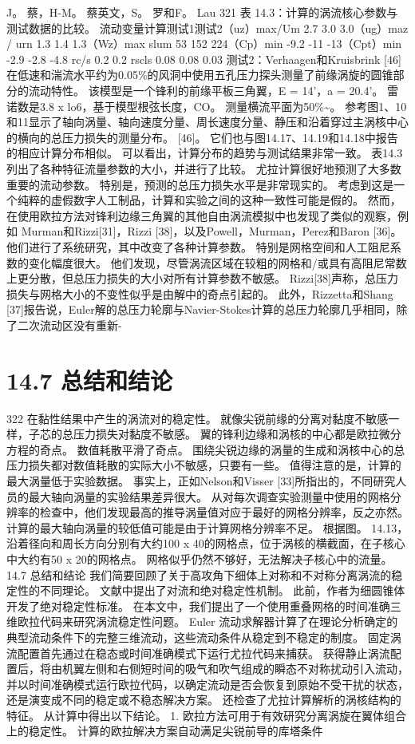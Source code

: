\documentclass[UTF8,11pt,a4paper,openany,fontset=fandol]{ctexbook}
\begin{document}
J。 蔡，H-M。 蔡英文，S。 罗和F。 Lau 321 表 14.3：计算的涡流核心参数与测试数据的比较。 流动变量计算测试1测试2（uz）max/Um 2.7 3.0 3.0（ug）maz / urn 1.3 1.4 1.3（Wz）max slum 53 152 224（Cp）min -9.2 -11 -13（Cpt）min -2.9 -2.8 -4.8 rc/s 0.2 0.2 rscls 0.08 0.08 0.03 测试2：Verhaagen和Kruisbrink [46]在低速和湍流水平约为0.05\%的风洞中使用五孔压力探头测量了前缘涡旋的圆锥部分的流动特性。 该模型是一个锋利的前缘平板三角翼，E = 14'，a = 20.4'。 雷诺数是3.8 x lo6，基于模型根弦长度，CO。 测量横流平面为50\%\textasciitilde{}。 参考图1、10和11显示了轴向涡量、轴向速度分量、周长速度分量、静压和沿着穿过主涡核中心的横向的总压力损失的测量分布。 [46]。 它们也与图14.17、14.19和14.18中报告的相应计算分布相似。 可以看出，计算分布的趋势与测试结果非常一致。 表14.3列出了各种特征流量参数的大小，并进行了比较。 尤拉计算很好地预测了大多数重要的流动参数。 特别是，预测的总压力损失水平是非常现实的。 考虑到这是一个纯粹的虚假数字人工制品，计算和实验之间的这种一致性可能是假的。 然而，在使用欧拉方法对锋利边缘三角翼的其他自由涡流模拟中也发现了类似的观察，例如 Murman和Rizzi[31]，Rizzi [38]，以及Powell，Murman，Perez和Baron [36]。 他们进行了系统研究，其中改变了各种计算参数。 特别是网格空间和人工阻尼系数的变化幅度很大。 他们发现，尽管涡流区域在较粗的网格和/或具有高阻尼常数上更分散，但总压力损失的大小对所有计算参数不敏感。 Rizzi[38]声称，总压力损失与网格大小的不变性似乎是由解中的奇点引起的。 此外，Rizzetta和Shang [37]报告说，Euler解的总压力轮廓与Navier-Stokes计算的总压力轮廓几乎相同，除了二次流动区没有重新-

\section{14.7 总结和结论}
322 在黏性结果中产生的涡流对的稳定性。 就像尖锐前缘的分离对黏度不敏感一样，子芯的总压力损失对黏度不敏感。 翼的锋利边缘和涡核的中心都是欧拉微分方程的奇点。 数值耗散平滑了奇点。 围绕尖锐边缘的涡量的生成和涡核中心的总压力损失都对数值耗散的实际大小不敏感，只要有一些。 值得注意的是，计算的最大涡量低于实验数据。 事实上，正如Nelson和Visser [33]所指出的，不同研究人员的最大轴向涡量的实验结果差异很大。 从对每次调查实验测量中使用的网格分辨率的检查中，他们发现最高的推导涡量值对应于最好的网格分辨率，反之亦然。 计算的最大轴向涡量的较低值可能是由于计算网格分辨率不足。 根据图。 14.13，沿着径向和周长方向分别有大约100 x 40的网格点，位于涡核的横截面，在子核心中大约有50 x 20的网格点。 网格似乎仍然不够好，无法解决子核心中的流量。 14.7 总结和结论 我们简要回顾了关于高攻角下细体上对称和不对称分离涡流的稳定性的不同理论。 文献中提出了对流和绝对稳定性机制。 此前，作者为细圆锥体开发了绝对稳定性标准。 在本文中，我们提出了一个使用重叠网格的时间准确三维欧拉代码来研究涡流稳定性问题。 Euler 流动求解器计算了在理论分析确定的典型流动条件下的完整三维流动，这些流动条件从稳定到不稳定的制度。 固定涡流配置首先通过在稳态或时间准确模式下运行尤拉代码来捕获。 获得静止涡流配置后，将由机翼左侧和右侧短时间的吸气和吹气组成的瞬态不对称扰动引入流动，并以时间准确模式运行欧拉代码，以确定流动是否会恢复到原始不受干扰的状态，还是演变成不同的稳定或不稳态解决方案。 还检查了尤拉计算解析的涡核结构的特征。 从计算中得出以下结论。 1. 欧拉方法可用于有效研究分离涡旋在翼体组合上的稳定性。 计算的欧拉解决方案自动满足尖锐前导的库塔条件
\end{document}
